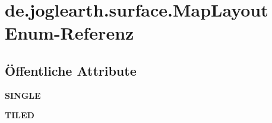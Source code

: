 \section{de.\-joglearth.\-surface.\-Map\-Layout Enum-\/\-Referenz}
\label{enumde_1_1joglearth_1_1surface_1_1_map_layout}
\subsection*{Öffentliche Attribute}
\begin{DoxyCompactItemize}
\item 
{\bfseries S\-I\-N\-G\-L\-E}\label{enumde_1_1joglearth_1_1surface_1_1_map_layout_aaf8ac710f3eea275826fd076c50fc8d7}

\item 
{\bfseries T\-I\-L\-E\-D}\label{enumde_1_1joglearth_1_1surface_1_1_map_layout_a34fb5878c3f2ced5cde314ba468d7d7f}

\end{DoxyCompactItemize}
